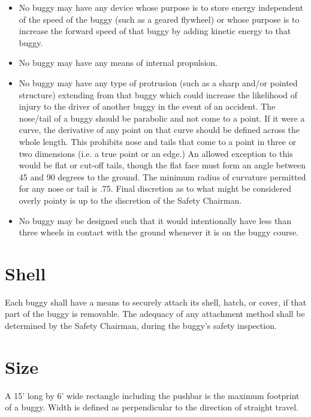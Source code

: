 	\begin{itemize}

		\item
		No buggy may have any device whose purpose is to store energy independent of
		the speed of the buggy (such as a geared flywheel) or whose purpose is to
		increase the forward speed of that buggy by adding kinetic energy to that
		buggy.

		\item
		No buggy may have any means of internal propulsion.

		\item
		No buggy may have any type of protrusion (such as a sharp and/or pointed
		structure) extending from that buggy which could increase the likelihood of
		injury to the driver of another buggy in the event of an accident. The
		nose/tail of a buggy should be parabolic and not come to a point. If it were a
		curve, the derivative of any point on that curve should be defined across the
		whole length. This prohibits nose and tails that come to a point in three or
		two dimensions (i.e. a true point or an edge.) An allowed exception to this
		would be flat or cut-off tails, though the flat face must form an angle between
		45 and 90 degrees to the ground. The minimum radius of curvature permitted for
		any nose or tail is .75. Final discretion as to what might be considered overly
		pointy is up to the discretion of the Safety Chairman.

		\item
		No buggy may be designed such that it would intentionally have less than three
		wheels in contact with the ground whenever it is on the buggy course.

	\end{itemize}

\section{Shell}

	Each buggy shall have a means to securely attach its shell, hatch, or cover, if
	that part of the buggy is removable. The adequacy of any attachment method
	shall be determined by the Safety Chairman, during the buggy's safety
	inspection.

\section{Size}

	A 15' long by 6' wide rectangle including the pushbar is the maximum footprint
	of a buggy. Width is defined as perpendicular to the direction of straight travel.

